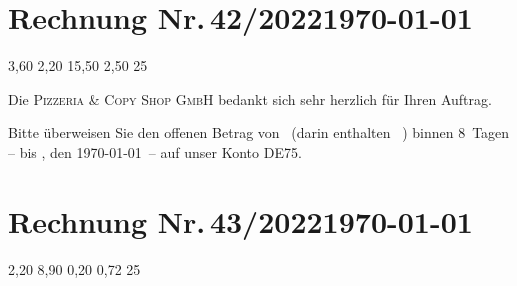 \documentclass[12pt]{scrartcl}		%
\begin{document}
\section*{Rechnung Nr.\,42/2022\hfill\today}	%
	\begin{invoice*}[B]				%
		\UseEuro					%
		\NumbersOn					%
		\SeparatorOff				%


				{3,60}
			{2,20}
									{15,50}
							{2,50}
						{25}
	\end{invoice*}
\def\payperiod{8}					%

Die \textsc{Pizzeria \& Copy Shop GmbH} bedankt sich sehr herzlich für Ihren Auftrag. 

Bitte überweisen Sie den offenen Betrag von 
\Total\ (darin enthalten \TaxAmnt ~\TaxAbrv) 
binnen \payperiod~Tagen – bis \DayName{\year}{\month}{\day+\payperiod}, 
den \AdvanceDate[\payperiod]\today\ – 
auf unser Konto DE75.

\AdvanceDate[-\payperiod]		%

\section*{Rechnung Nr.\,43/2022\hfill\today}
	\begin{invoice}[N]				%
		\NumbersOff					%
		\SeparatorOff				%
			{2,20}
									{8,90}
								{0,20}
							{0,72}
						{25}
	\end{invoice}
\end{document}
